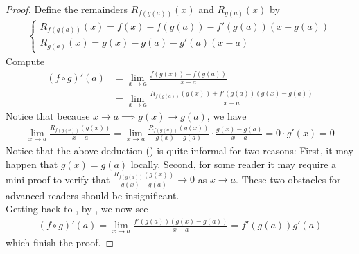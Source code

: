 \documentclass{report}
\begin{document}
\begin{proof}
Define the remainders $R_{f(g(a))}(x)$ and $R_{g(a)}(x)$ by 
\begin{align*}
\begin{cases}
R_{f(g(a))}(x)=f(x)-f(g(a))-f'(g(a))(x-g(a))\\
R_{g(a)}(x)=g(x)-g(a)-g'(a)(x-a)
\end{cases}
\end{align*}
Compute 
\begin{align}
\label{3.13}
  (f\circ g)'(a)&=\lim_{ x\to a}\frac{f(g(x))-f(g(a))}{x-a}\\
  &=\lim_{x\to a}\frac{R_{f(g(a))}(g(x))+f'(g(a))(g(x)-g(a))}{x-a}
\end{align}
Notice that because $x \to a \implies g(x)\to g(a)$, we have 
\begin{align}
\label{3.12}
\lim_{x\to a} \frac{R_{f(g(a))}(g(x))}{x-a}=\lim_{ x\to a} \frac{R_{f(g(a))}(g(x))}{g(x)-g(a)}\cdot \frac{g(x)-g(a)}{x-a}=0\cdot g'(x)=0
\end{align}
Notice that the above deduction () is quite informal for two reasons: First, it may happen that $g(x)=g(a)$ locally. Second, for some reader it may require a mini proof to verify that $\frac{R_{f(g(a))}(g(x))}{g(x)-g(a)}\to 0$ as $x\to a$. These two obstacles for advanced readers should be insignificant.\\

Getting back to , by , we now see 
\begin{align*}
  (f\circ g)'(a)=\lim_{x\to a}\frac{f'(g(a))(g(x)-g(a))}{x-a}=f'(g(a))g'(a)
\end{align*}
which finish the proof.
\end{proof}
\end{document}
